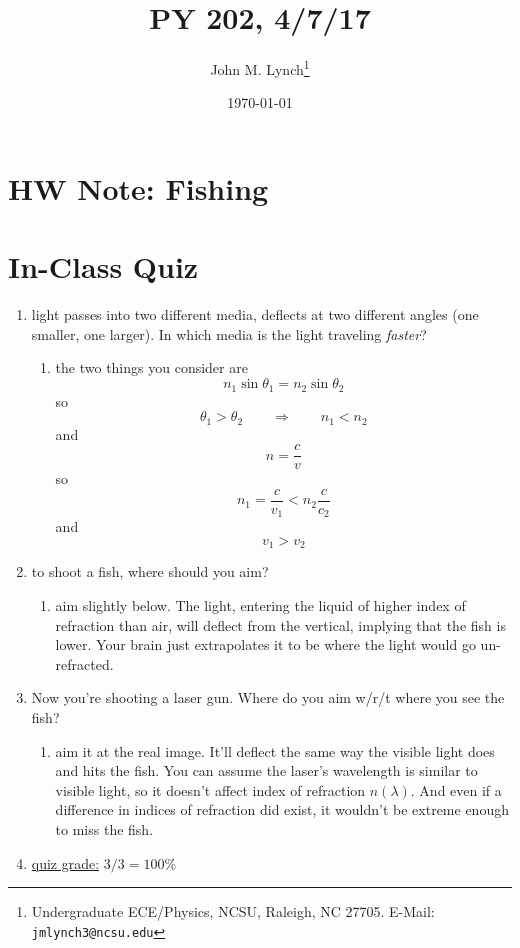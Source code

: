 \documentclass[twocolumn,draft]{article}
\title{PY 202, 4/7/17}
\author{John M. Lynch\footnote{Undergraduate ECE/Physics, NCSU, Raleigh, NC 27705. E-Mail: \texttt{jmlynch3@ncsu.edu}}}
\date{\today}
\begin{document}
  \maketitle
\section*{HW Note: Fishing}
\section*{In-Class Quiz}
\begin{enumerate}
	\item 
		light passes into two different media, deflects at two different angles (one smaller, one
		larger). In which media is the light traveling \emph{faster}?
			\begin{enumerate}
				\item the two things you consider are
				\begin{equation*}
					n_{1}\sin{\theta_{1}} = n_{2}\sin{\theta_{2}}
				\end{equation*}
				so
				\begin{equation*}
					\theta_{1} > \theta_{2} \qquad\Longrightarrow\qquad n_{1} < n_{2}
				\end{equation*}
				and
				\begin{equation*}
					n = \frac{c}{v}
				\end{equation*}
				so
				\begin{equation*}
					n_{1} = \frac{c}{v_{1}} < n_{2}  \frac{c}{c_{2}}
				\end{equation*}
				and
				\begin{equation*}
					v_{1} > v_{2}
				\end{equation*}
			\end{enumerate}
			
	\item to shoot a fish, where should you aim?
		\begin{enumerate}
			\item aim slightly below. The light, entering the liquid of higher index of refraction
				than air, will deflect from the vertical, implying that the fish is lower. Your
				brain just extrapolates it to be where the light would go un-refracted.
		\end{enumerate}
		
	\item Now you're shooting a laser gun. Where do you aim w/r/t where you see the fish?
		\begin{enumerate}
			\item aim it at the real image. It'll deflect the same way the visible light does
				and hits the fish. You can assume the laser's wavelength is similar to visible
				light, so it doesn't affect index of refraction $n(\lambda)$. And even if a 
				difference in indices of refraction did exist, it wouldn't be extreme enough to
				miss the fish. 
		\end{enumerate}
	\item \underline{quiz grade:} $3/3 = 100$\%
\end{enumerate}
\end{document}
